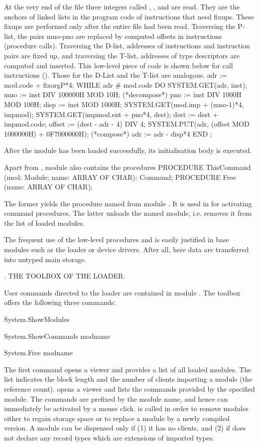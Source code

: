 At the very end of the file three integers called , , and  are read. They are the anchors of linked lists in the program code of instructions that need fixups. These fixups are performed only after the entire file had been read. Traversing the P-list, the pairs mno-pno are replaced by computed offsets in  instructions (procedure calls). Traversing the D-list, addresses of  instructions and instruction pairs are fixed up, and traversing the T-list, addresses of type descriptors are computed and inserted. This low-level piece of code is shown below for call instructions (). Those for the D-List and the T-list are analogous.
\begintt
adr := mod.code + fixorgP*4;
WHILE adr # mod.code DO
  SYSTEM.GET(adr, inst);
  mno := inst DIV 100000H MOD 10H; (*decompose*)
  pno := inst DIV 1000H MOD 100H;
  disp := inst MOD 1000H;
  SYSTEM.GET(mod.imp + (mno-1)*4, impmod);
  SYSTEM.GET(impmod.ent + pno*4, dest); dest := dest + impmod.code;
  offset := (dest - adr - 4) DIV 4;
  SYSTEM.PUT(adr, (offset MOD 1000000H) + 0F7000000H); (*compose*)
  adr := adr - disp*4
END ;
\endtt

\noindent After the module has been loaded successfully, its initialisation body is executed.

Apart from , module  also contains the procedures
\begintt
PROCEDURE ThisCommand (mod: Module; name: ARRAY OF CHAR): Command;
PROCEDURE Free (name: ARRAY OF CHAR);
\endtt

\noindent The former yields the procedure named  from module . It is used in  for activating command procedures. The latter unloads the named module, i.e. removes it from the list of loaded modules.

The frequent use of the low-level procedures  and  is easily justified in base modules such as the loader or device drivers. After all, here data are transferred into untyped main storage.

. THE TOOLBOX OF THE LOADER.

User commands directed to the loader are contained in module . The toolbox offers the following three commands:

System.ShowModules

System.ShowCommands modname

System.Free {modname} ~

\noindent The first command opens a viewer and provides a list of all loaded modules. The list indicates the block length and the number of clients importing a module (the reference count).  opens a viewer and lists the commands provided by the specified module. The commands are prefixed by the module name, and hence can immediately be activated by a mouse click.  is called in order to remove modules either to regain storage space or to replace a module by a newly compiled version. A module can be dispensed only if (1) it has no clients, and (2) if does not declare any record types which are extensions of imported types.

